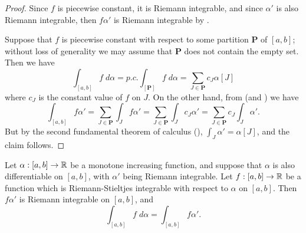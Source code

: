 \begin{proof}
  Since \(f\) is piecewise constant, it is Riemann integrable, and since \(\alpha'\) is also Riemann integrable, then \(f \alpha'\) is Riemann integrable by .

  Suppose that \(f\) is piecewise constant with respect to some partition \(\mathbf{P}\) of \([a, b]\);
  without loss of generality we may assume that \(\mathbf{P}\) does not contain the empty set.
  Then we have
  \[
    \int_{[a, b]} f \; d \alpha = p.c. \int_{[\mathbf{P}]} f \; d \alpha = \sum_{J \in \mathbf{P}} c_J \alpha[J]
  \]
  where \(c_J\) is the constant value of \(f\) on \(J\).
  On the other hand, from  (and ) we have
  \[
    \int_{[a, b]} f \alpha' = \sum_{J \in \mathbf{P}} \int_J f \alpha' = \sum_{J \in \mathbf{P}} \int_J c_J \alpha' = \sum_{J \in \mathbf{P}} c_J \int_J \alpha'.
  \]
  But by the second fundamental theorem of calculus (), \(\int_J \alpha' = \alpha[J]\), and the claim follows.
\end{proof}

\begin{cor}\label{i:11.10.3}
  Let \(\alpha : [a, b] \to \mathbb{R}\) be a monotone increasing function, and suppose that \(\alpha\) is also differentiable on \([a, b]\), with \(\alpha'\) being Riemann integrable.
  Let \(f : [a, b] \to \mathbb{R}\) be a function which is Riemann-Stieltjes integrable with respect to \(\alpha\) on \([a, b]\).
  Then \(f \alpha'\) is Riemann integrable on \([a, b]\), and
  \[
    \int_{[a, b]} f \; d \alpha = \int_{[a, b]} f \alpha'.
  \]
\end{cor}

